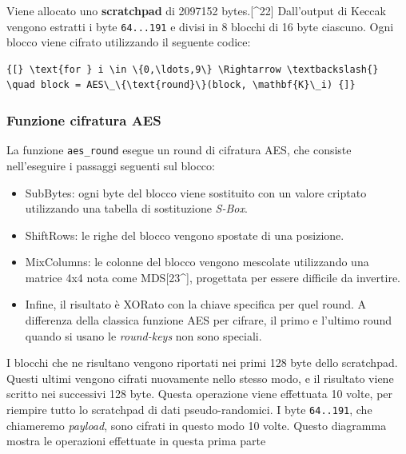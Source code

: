 Viene allocato uno \textbf{scratchpad} di 2097152 bytes.{[}\^{}22{]}
Dall'output di Keccak vengono estratti i byte \texttt{64...191} e divisi
in 8 blocchi di 16 byte ciascuno. Ogni blocco viene cifrato utilizzando
il seguente codice:
\begin{verbatim}
{[} \text{for } i \in \{0,\ldots,9\} \Rightarrow \textbackslash{}
\quad block = AES\_\{\text{round}\}(block, \mathbf{K}\_i) {]}
\end{verbatim}


\subsubsection{Funzione cifratura AES}\label{funzione-cifratura-aes}

La funzione \texttt{aes\_round} esegue un round di cifratura AES, che
consiste nell'eseguire i passaggi seguenti sul blocco:

\begin{itemize}
\item
  SubBytes: ogni byte del blocco viene sostituito con un valore criptato
  utilizzando una tabella di sostituzione \emph{S-Box}.
\item
  ShiftRows: le righe del blocco vengono spostate di una posizione.
\item
  MixColumns: le colonne del blocco vengono mescolate utilizzando una
  matrice 4x4 nota come MDS{[}23\^{}{]}, progettata per essere difficile
  da invertire.
\item
  Infine, il risultato è XORato con la chiave specifica per quel round.
  A differenza della classica funzione AES per cifrare, il primo e
  l'ultimo round quando si usano le \emph{round-keys} non sono speciali.
\end{itemize}

I blocchi che ne risultano vengono riportati nei primi 128 byte dello
scratchpad. Questi ultimi vengono cifrati nuovamente nello stesso modo,
e il risultato viene scritto nei successivi 128 byte. Questa operazione
viene effettuata 10 volte, per riempire tutto lo scratchpad di dati
pseudo-randomici. I byte \texttt{64..191}, che chiameremo
\emph{payload}, sono cifrati in questo modo 10 volte. Questo diagramma
mostra le operazioni effettuate in questa prima parte

